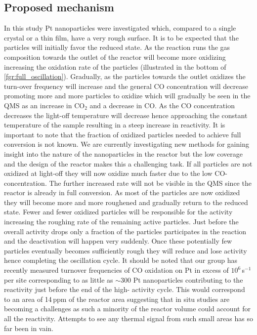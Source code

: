 \documentclass[journal=jacsat,manuscript=article]{achemso}
\begin{document}
\subsection{Proposed mechanism}
In this study Pt nanoparticles were investigated which, compared to a single
crystal or a thin film, have a very rough surface. It is to be expected that the
particles will initially favor the reduced state. As the reaction runs the gas
composition towards the outlet of the reactor will become more oxidizing
increasing the oxidation rate of the particles (illustrated in the bottom of
\ref{fgr:full_oscillation}). Gradually, as the particles towards the outlet
oxidizes the turn-over frequency will increase and the general CO concentration will
decrease promoting more and more particles to oxidize which will gradually be
seen in the QMS as an increase in CO$_2$ and a decrease in CO. As the CO
concentration decreases the light-off temperature will decrease hence
approaching the constant temperature of the sample resulting in a steep
increase in reactivity. It is important to note that the fraction of oxidized
particles needed to achieve full conversion is not known. We are currently
investigating new methods for gaining insight into the nature of the
nanoparticles in the reactor but the low coverage and the design of the reactor
makes this a challenging task. If all particles are not oxidized at light-off
they will now oxidize much faster due to the low CO-concentration. The further
increased rate will not be visible in the QMS since the reactor is already in
full conversion. As most of the particles are now oxidized they will become
more and more roughened and gradually return to the reduced state. Fewer and
fewer oxidized particles will be responsible for the activity increasing the
roughing rate of the remaining active particles. Just before the overall
activity drops only a fraction of the particles participates in the reaction
and the deactivation will happen very suddenly. Once these potentially few
particles eventually becomes sufficiently rough they will reduce and lose
activity hence completing the oscillation cycle. It should be noted that our
group has recently measured turnover frequencies of CO oxidation on Pt in
excess of $10^{6}$\,s$^{-1}$ per site corresponding to as little as $\sim$300 Pt
nanoparticles contributing to the reactivity just before the end of the high-
activity cycle. This would correspond to an area of 14\,ppm of the reactor
area suggesting that in situ studies are becoming a challenges as such a
minority of the reactor volume could account for all the reactivity. Attempts
to see any thermal signal from such small areas has so far been in vain.
\end{document}
